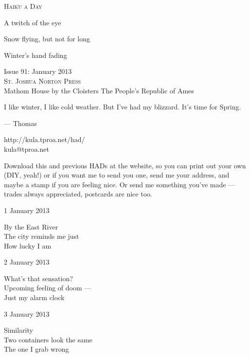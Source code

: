 \documentclass[12pt]{article}
\begin{document}
\begin{center}
{\fontsize{36}{48}\selectfont \textsc{Haiku a Day }}
\end{center}

\vspace*{3.5cm}

{\fontsize{20}{40}\selectfont 

A twitch of the eye

Snow flying, but not for long

Winter's hand fading


}

\vspace*{5.0cm}
\begin{center}
{\large{Issue 91: January 2013}} \\[5mm]
{\fontsize{8}{8}\selectfont  \textsc{ St. Joshua Norton Press }} \\[1mm]
{\fontsize{6}{6}\selectfont Mathom House by the Cloisters \textbar The People's Republic of Ames }
\end{center}


\newpage

I like winter, I like cold weather. But I've had my blizzard. It's time for Spring.

--- Thomas

http://kula.tproa.net/had/ \\
kula@tproa.net

Download this and previous HADs at the website, so you can
print out your own (DIY, yeah!) or if you want me to send
you one, send me your address, and maybe a stamp if you
are feeling nice. Or send me something you've made ---
trades always appreciated, postcards are nice too.

\vfill

1 January 2013

By the East River \\
The city reminds me just \\
How lucky I am

2 January 2013

What's that sensation? \\
Upcoming feeling of doom --- \\
Just my alarm clock

3 January 2013

Similarity \\
Two containers look the same \\
The one I grab wrong

\newpage
\end{document}
